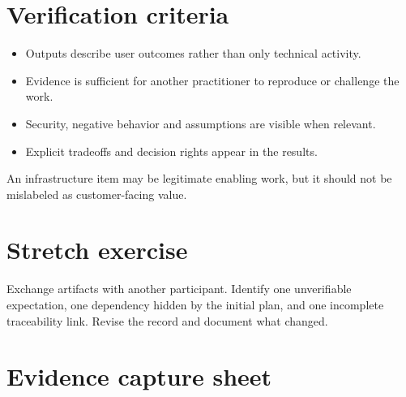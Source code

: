 \documentclass[11pt,letterpaper]{article}
\begin{document}
\section{Verification criteria}
\begin{itemize}[leftmargin=*,itemsep=2pt]
\item Outputs describe user outcomes rather than only technical activity.
\item Evidence is sufficient for another practitioner to reproduce or challenge the work.
\item Security, negative behavior and assumptions are visible when relevant.
\item Explicit tradeoffs and decision rights appear in the results.
\end{itemize}
\begin{tcolorbox}[colback=amberback,colframe=navy,title={Instructor note / expected reasoning},breakable]
An infrastructure item may be legitimate enabling work, but it should not be mislabeled as customer-facing value.

\end{tcolorbox}
\section{Stretch exercise}
Exchange artifacts with another participant. Identify one unverifiable expectation, one dependency hidden by the initial plan, and one incomplete traceability link. Revise the record and document what changed.

\section{Evidence capture sheet}
\end{document}
